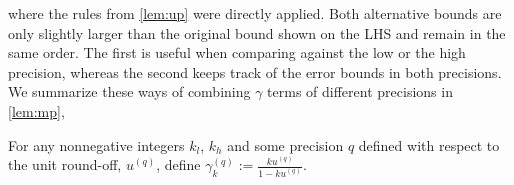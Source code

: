 where the rules from \cref{lem:up} were directly applied.
Both alternative bounds are only slightly larger than the original bound shown on the LHS and remain in the same order.
The first is useful when comparing against the low or the high precision, whereas the second keeps track of the error bounds in both precisions.
We summarize these ways of combining $\gamma$ terms of different precisions in \cref{lem:mp},
\begin{lemma}\label{lem:mp}
	For any nonnegative integers $k_l$, $k_h$ and some precision $q$ defined with respect to the unit round-off, $u^{(q)}$, define $\gamma^{(q)}_{k} := \frac{k u^{(q)} }{1-ku^{(q)}}$.

\end{lemma}
